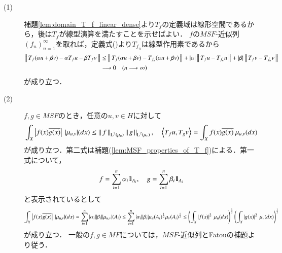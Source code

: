 	\begin{prf}\mbox{}
		\begin{description}
			\item[(1)]	補題\ref{lem:domain_T_f_linear_dense}より$T_f$の定義域は線形空間であるから，後は$T_f$が線型演算を満たすことを示せばよい．
					$f$の$MSF$-近似列$(f_n)_{n=1}^{\infty}$を取れば，定義式()より$T_{f_n}$は線型作用素であるから
					\begin{align}
						\left\|\, T_f (\alpha u + \beta v) - \alpha T_f u - \beta T_f v\, \right\|_{}
						&\leq \left\|\, T_f (\alpha u + \beta v) - T_{f_n} (\alpha u + \beta v)\, \right\|_{}
							+ |\alpha| \left\|\, T_f u - T_{f_n} u\, \right\|_{} + |\beta| \left\|\, T_f v - T_{f_n} v\, \right\|_{} \\
						&\longrightarrow 0 \quad (n \longrightarrow \infty)
					\end{align}
					が成り立つ．
					
			\item[(2)] $f,g \in MSF$のとき，任意の$u,v \in H$に対して
				\begin{align}
					\int_X \left| f(x) \conj{g(x)} \right|\ |\mu_{u,v}|(dx) \leq \Norm{f}{\Lp{2}{\mu_u}} \Norm{g}{\Lp{2}{\mu_v}},
					\quad \inprod<T_f u, T_g v> = \int_X f(x) \conj{g(x)}\ \mu_{u,v}(dx)
				\end{align}
				が成り立つ．第二式は補題(\ref{lem:MSF_properties_of_T_f})による．第一式について，
				\begin{align}
					f = \sum_{i=1}^{n} \alpha_i \mbox{1}\hspace{-0.25em}\mbox{l}_{A_i},\quad 
					g = \sum_{i=1}^{n} \beta_i \mbox{1}\hspace{-0.25em}\mbox{l}_{A_i}
				\end{align}
				と表示されているとして
				\begin{align}
					\int_X \left| f(x) \conj{g(x)} \right|\ |\mu_{u,v}|(dx)
					= \sum_{i=1}^{n} |\alpha_i||\beta_i| |\mu_{u,v}|(A_i)
					\leq \sum_{i=1}^{n} |\alpha_i||\beta_i| \mu_u(A_i)^{\frac{1}{2}} \mu_v(A_i)^{\frac{1}{2}}
					\leq \left( \int_X \left| f(x) \right|^2\ \mu_u(dx) \right)^{\frac{1}{2}} \left( \int_X \left| g(x) \right|^2\ \mu_v(dx) \right)^{\frac{1}{2}}
				\end{align}
				が成り立つ．
				一般の$f,g \in MF$については，$MSF$-近似列とFatouの補題より従う．
				

\end{description}
\end{prf}
